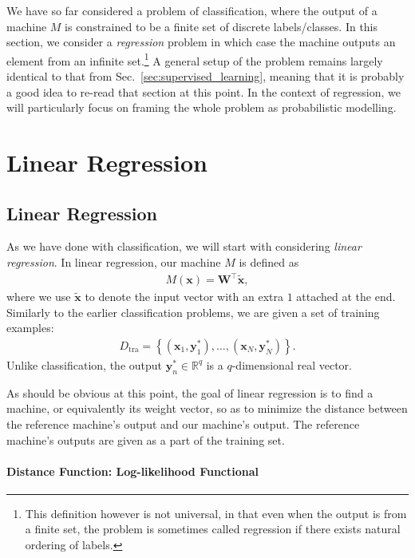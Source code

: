 \documentclass{report}
\newcommand{\vect}[1]{\mathbf{#1}}
\newcommand{\matr}[1]{\mathbf{#1}}
\newcommand{\vx}[0]{\vect{x}}
\newcommand{\vy}[0]{\vect{y}}
\newcommand{\mW}[0]{\matr{W}}
\newcommand{\RR}[0]{\mathbb{R}}
\newcommand{\tra}{\text{tra}}
\begin{document}
We have so far considered a problem of classification, where the output of a
machine $M$ is constrained to be a finite set of discrete labels/classes. In
this section, we consider a {\it regression} problem in which case the machine
outputs an element from an infinite set.\footnote{
    This definition however is not universal, in that even when the output is
    from a finite set, the problem is sometimes called regression if there
    exists natural ordering of labels.
} A general setup of the problem remains largely identical to that from
Sec.~\ref{sec:supervised_learning}, meaning that it is probably a good idea to
re-read that section at this point.  In the context of regression, we will
particularly focus on framing the whole problem as probabilistic modelling. 

\section{Linear Regression}
\label{sec:linear-regression}

\subsection{Linear Regression}

As we have done with classification, we will start with considering {\it linear
regression}. In linear regression, our machine $M$ is defined as 
\begin{align*}
    M(\vx) = \mW^\top \tilde{\vx},
\end{align*}
where we use $\tilde{\vx}$ to denote the input vector with an extra $1$ attached
at the end.  Similarly to the earlier classification problems, we are given a
set of training examples:
\begin{align*}
    D_{\tra} = \left\{ 
        (\vx_1, \vy_1^*), \ldots, (\vx_N, \vy_N^*)
    \right\}.
\end{align*}
Unlike classification, the output $\vy_n^* \in \RR^q$ is a $q$-dimensional real
vector. 

As should be obvious at this point, the goal of linear regression is to find a
machine, or equivalently its weight vector, so as to minimize the distance
between the reference machine's output and our machine's output. The reference
machine's outputs are given as a part of the training set.

\paragraph{Distance Function: Log-likelihood Functional}
\end{document}
